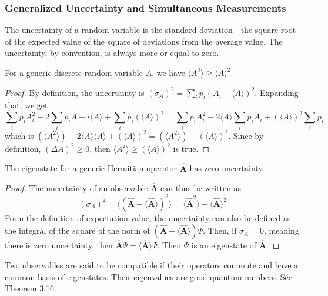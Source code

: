 \documentclass[a4paper]{article}
\begin{document}
\subsubsection*{Generalized Uncertainty and Simultaneous Measurements}
\begin{defi}[Uncertainty]
The uncertainty of a random variable is the standard deviation - the square root of the expected value of the square of deviations from the average value. The uncertainty, by convention, is always more or equal to zero.
\end{defi}
\begin{thm}
For a generic discrete random variable $A$, we have $\langle A^2\rangle\geq\langle A\rangle^2$.
\end{thm}
\begin{proof}
By definition, the uncertainty is $(\sigma_A)^2=\sum_ip_i(A_i-\big\langle A\big\rangle)^2$. Expanding that, we get
$$\sum_ip_iA_i^2-2\sum_ip_iA+i\big\langle A\big\rangle+\sum_ip_i(\big\langle A\big\rangle)^2=\sum_ip_iA_i^2-2\big\langle A\big\rangle\sum_ip_iA_i+(\big\langle A\big\rangle)^2\sum_ip_i$$
which is $(\big\langle A^2\big\rangle)-2\big\langle A\big\rangle\big\langle A\big\rangle+(\big\langle A\big\rangle)^2=(\big\langle A^2\big\rangle)-(\big\langle A\big\rangle)^2$.
Since by definition, $(\Delta A)^2\geq0$, then $\big\langle A^2\big\rangle\geq(\big\langle A\big\rangle)^2$ is true.
\end{proof}
\begin{thm}
The eigenstate for a generic Hermitian operator $\mathbf{\hat{A}}$ has zero uncertainty.
\end{thm}
\begin{proof}
The uncertainty of an observable $\mathbf{\hat{A}}$ can thus be written as
$$(\sigma_A)^2=\big\langle(\mathbf{\hat{A}}-\big\langle\mathbf{\hat{A}}\big\rangle)^2\big\rangle=\big\langle\mathbf{\hat{A}}^2\big\rangle-\big\langle\mathbf{\hat{A}}\big\rangle^2$$
From the definition of expectation value, the uncertainty can also be defined as the integral of the square of the norm of $(\mathbf{\hat{A}}-\big\langle\mathbf{\hat{A}}\big\rangle)\Psi$. Then, if $\sigma_A=0$, meaning there is zero uncertainty, then $\mathbf{\hat{A}}\Psi=\big\langle\mathbf{\hat{A}}\big\rangle\Psi$. Then $\Psi$ is an eigenstate of $\mathbf{\hat{A}}$.
\end{proof}
\begin{defi}
Two observables are said to be compatible if their operators commute and have a common basis of eigenstates. Their eigenvalues are good quantum numbers. See Theorem 3.16.
\end{defi}
\end{document}
